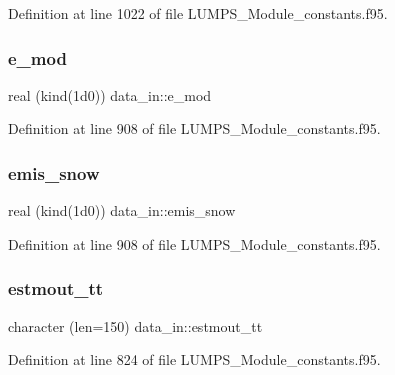 Definition at line 1022 of file L\+U\+M\+P\+S\+\_\+\+Module\+\_\+constants.\+f95.

\mbox{\label{namespacedata__in_a737780f5cf53c9f2d3048bbfface32cd}} 
\subsubsection{\texorpdfstring{e\+\_\+mod}{e\_mod}}
{\footnotesize\ttfamily real (kind(1d0)) data\+\_\+in\+::e\+\_\+mod}



Definition at line 908 of file L\+U\+M\+P\+S\+\_\+\+Module\+\_\+constants.\+f95.

\mbox{\label{namespacedata__in_a262cd82bafaff209c3bca1c3b368931b}} 
\subsubsection{\texorpdfstring{emis\+\_\+snow}{emis\_snow}}
{\footnotesize\ttfamily real (kind(1d0)) data\+\_\+in\+::emis\+\_\+snow}



Definition at line 908 of file L\+U\+M\+P\+S\+\_\+\+Module\+\_\+constants.\+f95.

\mbox{\label{namespacedata__in_ab3963c227716bf7ca52ecd4fcc7a8e67}} 
\subsubsection{\texorpdfstring{estmout\+\_\+tt}{estmout\_tt}}
{\footnotesize\ttfamily character (len=150) data\+\_\+in\+::estmout\+\_\+tt}



Definition at line 824 of file L\+U\+M\+P\+S\+\_\+\+Module\+\_\+constants.\+f95.

\mbox{\label{namespacedata__in_a8bc526d8d9a75c1ecef04817aac48046}} 

